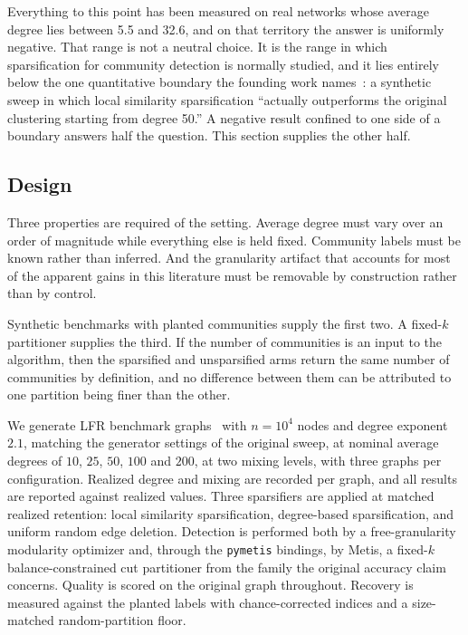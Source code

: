 
Everything to this point has been measured on real networks whose average degree
lies between 5.5 and 32.6, and on that territory the answer is uniformly
negative. That range is not a neutral choice. It is the range in which
sparsification for community detection is normally studied, and it lies entirely
below the one quantitative boundary the founding work
names~\cite{satuluri2011local}: a synthetic sweep in which local similarity
sparsification ``actually outperforms the original clustering starting from
degree 50.'' A negative result confined to one side of a boundary answers half
the question. This section supplies the other half.

\subsection{Design}

Three properties are required of the setting. Average degree must vary over an
order of magnitude while everything else is held fixed. Community labels must be
known rather than inferred. And the granularity artifact that accounts for most
of the apparent gains in this literature must be removable by construction rather
than by control.

Synthetic benchmarks with planted communities supply the first two. A fixed-$k$
partitioner supplies the third. If the number of communities is an input to the
algorithm, then the sparsified and unsparsified arms return the same number of
communities by definition, and no difference between them can be attributed to
one partition being finer than the other.

We generate LFR benchmark graphs~\cite{lancichinetti2008benchmark} with
$n = 10^4$ nodes and degree exponent $2.1$, matching the generator settings of
the original sweep, at nominal average degrees of $10$, $25$, $50$, $100$ and
$200$, at two mixing levels, with three graphs per configuration. Realized degree
and mixing are recorded per graph, and all results are reported against realized
values. Three sparsifiers are applied at matched realized retention: local
similarity sparsification, degree-based sparsification, and uniform random edge
deletion. Detection is performed both by a free-granularity modularity optimizer
and, through the \texttt{pymetis} bindings, by Metis, a fixed-$k$
balance-constrained cut partitioner from the family the original accuracy claim
concerns. Quality is scored on the original graph throughout. Recovery is
measured against the planted labels with chance-corrected indices and a
size-matched random-partition floor.

